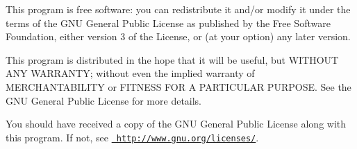 This program is free software\+: you can redistribute it and/or modify it under the terms of the G\+NU General Public License as published by the Free Software Foundation, either version 3 of the License, or (at your option) any later version.

This program is distributed in the hope that it will be useful, but W\+I\+T\+H\+O\+UT A\+NY W\+A\+R\+R\+A\+N\+TY; without even the implied warranty of M\+E\+R\+C\+H\+A\+N\+T\+A\+B\+I\+L\+I\+TY or F\+I\+T\+N\+E\+SS F\+OR A P\+A\+R\+T\+I\+C\+U\+L\+AR P\+U\+R\+P\+O\+SE. See the G\+NU General Public License for more details.

You should have received a copy of the G\+NU General Public License along with this program. If not, see \href{http://www.gnu.org/licenses/}{\texttt{ http\+://www.\+gnu.\+org/licenses/}}. 